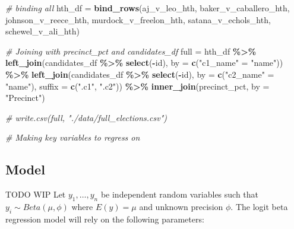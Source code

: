 \documentclass[
]{article}
\newenvironment{Shaded}{\begin{snugshade}}{\end{snugshade}}
\newcommand{\AttributeTok}[1]{\textcolor[rgb]{0.13,0.29,0.53}{#1}}
\newcommand{\CommentTok}[1]{\textcolor[rgb]{0.56,0.35,0.01}{\textit{#1}}}
\newcommand{\FunctionTok}[1]{\textcolor[rgb]{0.13,0.29,0.53}{\textbf{#1}}}
\newcommand{\NormalTok}[1]{#1}
\newcommand{\OtherTok}[1]{\textcolor[rgb]{0.56,0.35,0.01}{#1}}
\newcommand{\SpecialCharTok}[1]{\textcolor[rgb]{0.81,0.36,0.00}{\textbf{#1}}}
\newcommand{\StringTok}[1]{\textcolor[rgb]{0.31,0.60,0.02}{#1}}
\begin{document}
\begin{Shaded}
\begin{Highlighting}[]
\CommentTok{\# binding all}
\NormalTok{hth\_df }\OtherTok{=} \FunctionTok{bind\_rows}\NormalTok{(aj\_v\_leo\_hth, baker\_v\_caballero\_hth, johnson\_v\_reece\_hth, murdock\_v\_freelon\_hth, satana\_v\_echols\_hth, schewel\_v\_ali\_hth)}
\end{Highlighting}
\end{Shaded}

\begin{Shaded}
\begin{Highlighting}[]
\CommentTok{\# Joining with precinct\_pct and candidates\_df}
\NormalTok{full }\OtherTok{=}\NormalTok{ hth\_df }\SpecialCharTok{\%\textgreater{}\%}
  \FunctionTok{left\_join}\NormalTok{(candidates\_df }\SpecialCharTok{\%\textgreater{}\%} \FunctionTok{select}\NormalTok{(}\SpecialCharTok{{-}}\NormalTok{id), }\AttributeTok{by =} \FunctionTok{c}\NormalTok{(}\StringTok{"c1\_name"} \OtherTok{=} \StringTok{"name"}\NormalTok{)) }\SpecialCharTok{\%\textgreater{}\%}
  \FunctionTok{left\_join}\NormalTok{(candidates\_df }\SpecialCharTok{\%\textgreater{}\%} \FunctionTok{select}\NormalTok{(}\SpecialCharTok{{-}}\NormalTok{id), }\AttributeTok{by =} \FunctionTok{c}\NormalTok{(}\StringTok{"c2\_name"} \OtherTok{=} \StringTok{"name"}\NormalTok{), }\AttributeTok{suffix =} \FunctionTok{c}\NormalTok{(}\StringTok{".c1"}\NormalTok{, }\StringTok{".c2"}\NormalTok{)) }\SpecialCharTok{\%\textgreater{}\%}
  \FunctionTok{inner\_join}\NormalTok{(precinct\_pct, }\AttributeTok{by =} \StringTok{"Precinct"}\NormalTok{) }
  
\CommentTok{\# write.csv(full, "./data/full\_elections.csv")}
\end{Highlighting}
\end{Shaded}

\begin{Shaded}
\begin{Highlighting}[]
\CommentTok{\# Making key variables to regress on }
\end{Highlighting}
\end{Shaded}

\hypertarget{model}{%
\subsection{Model}\label{model}}

TODO WIP Let \(y_1,\dots,y_n\) be independent random variables such that
\(y_i \sim Beta(\mu, \phi)\) where \(E(y) = \mu\) and unknown precision
\(\phi\). The logit beta regression model will rely on the following
parameters:
\end{document}
